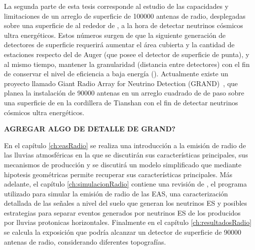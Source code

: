 La segunda parte de esta tesis corresponde al estudio de las capacidades y limitaciones de un arreglo de superficie de 100000 antenas de radio, desplegadas sobre una superficie de al rededor de , a la hora de detectar neutrinos cósmicos ultra energéticos.
Estos números surgen de que la siguiente generación de detectores de superficie requerir\'a aumentar el área cubierta y la cantidad de estaciones respecto del de Auger (que posee el detector de superficie de punta), y al mismo tiempo, mantener la granularidad (distancia entre detectores) con el fin de conservar el nivel de eficiencia a baja energ\'ia ().
Actualmente existe un proyecto llamado Giant Radio Array for Neutrino Detection (GRAND)~\cite{cite:grand_prop}, que planea la instalaci\'on de 90000 antenas en un arreglo cuadrado de  de paso sobre una superficie de  en la cordillera de Tianshan \cite{cite:grand_tec} con el fin de detectar neutrinos c\'osmicos ultra energ\'eticos.

\vspace*{5mm}
\textbf{AGREGAR ALGO DE DETALLE DE GRAND?}
\vspace*{5mm}

En el capítulo \ref{ch:easRadio} se realiza una introducción a la emisión de radio de las lluvias atmosféricas en la que se discutirán sus características principales, sus mecanismos de producción y se discutirá un modelo simplificado que mediante hipotesis geom\'etricas permite recuperar sus características principales.
Más adelante, el capítulo \ref{ch:simulacionRadio} contiene una revisión de \zhs{}, el programa utilizado para simular la emisión de radio de las EAS, una caracterización detallada de las señales a nivel del suelo que generan los neutrinos ES y posibles estrategias para separar eventos generados por neutrinos ES de los producidos por lluvias protonicas horizontales.
Finalmente en el capítulo \ref{ch:resultadosRadio} se calcula la exposición que podría alcanzar un detector de superficie de 90000 antenas de radio, considerando diferentes topografías.


